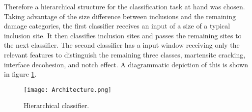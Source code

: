 Therefore a hierarchical structure for the classification task at hand was chosen. Taking advantage of the size difference between inclusions and the remaining damage categories, the first classifier receives an input of a size of a typical inclusion site. It then classifies inclusion sites and passes the remaining sites to the next classifier. The second classifier has a input window  receiving only the relevant features to distinguish the remaining three classes, martensite cracking, interface decohesion, and notch effect. A diagrammatic depiction of this is shown in figure \ref{fig:Architecture}.\\

%
%

\begin{figure}[H]
\begin{center}
  \texttt{[image: Architecture.png]}
\caption{Hierarchical classifier.}
\label{fig:Architecture}
\end{center}
\end{figure}

